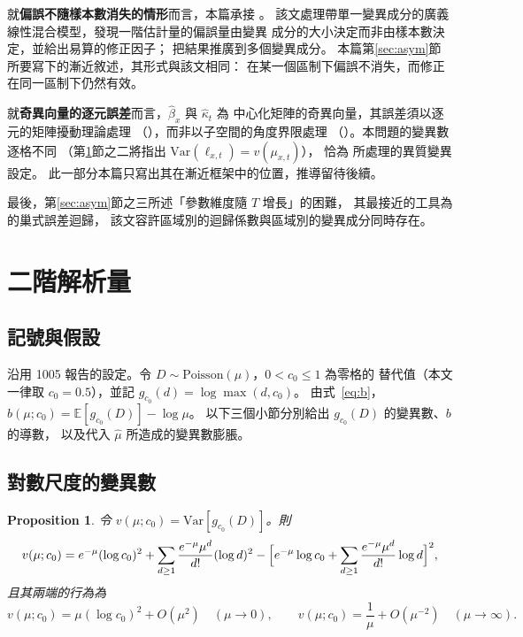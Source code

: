 \documentclass[UTF8, fontset=macnew, a4paper, 12pt]{ctexart}
\newcommand{\Ex}{\mathbb{E}}
\newtheorem{prop}{Proposition}
\begin{document}
就\textbf{偏誤不隨樣本數消失的情形}而言，本篇承接 \citet{breslow1995}。
該文處理帶單一變異成分的廣義線性混合模型，發現一階估計量的偏誤量由變異
成分的大小決定而非由樣本數決定，並給出易算的修正因子；
\citet{linbreslow1996} 把結果推廣到多個變異成分。
本篇第\ref{sec:asym}節所要寫下的漸近敘述，其形式與該文相同：
在某一個區制下偏誤不消失，而修正在同一區制下仍然有效。

就\textbf{奇異向量的逐元誤差}而言，$\hat\beta_x$ 與 $\hat\kappa_t$ 為
中心化矩陣的奇異向量，其誤差須以逐元的矩陣擾動理論處理
（\citealp{abbe2020}），而非以子空間的角度界限處理
（\citealp{caizhang2018}）。本問題的變異數逐格不同
（第\ref{sec:second}節之二將指出 $\mathrm{Var}(\ell_{x,t})=v(\mu_{x,t})$），
恰為 \citet{zhang2022} 所處理的異質變異設定。
此一部分本篇只寫出其在漸近框架中的位置，推導留待後續。

最後，第\ref{sec:asym}節之三所述「參數維度隨 $T$ 增長」的困難，
其最接近的工具為 \citet{lahiri2023} 的巢式誤差迴歸，
該文容許區域別的迴歸係數與區域別的變異成分同時存在。

\section{二階解析量}\label{sec:second}

\subsection{記號與假設}

沿用 1005 報告的設定。令 $D\sim\text{Poisson}(\mu)$，$0<c_0\le1$ 為零格的
替代值（本文一律取 $c_0=0.5$），並記 $g_{c_0}(d)=\log\max(d,c_0)$。
由式~\eqref{eq:b}，$b(\mu;c_0)=\Ex[g_{c_0}(D)]-\log\mu$。
以下三個小節分別給出 $g_{c_0}(D)$ 的變異數、$b$ 的導數，
以及代入 $\hat\mu$ 所造成的變異數膨脹。

\subsection{對數尺度的變異數}

\begin{prop}\label{prop:v}
令 $v(\mu;c_0)=\mathrm{Var}[g_{c_0}(D)]$。則
\begin{equation}\label{eq:v}
v(\mu;c_0)=e^{-\mu}(\log c_0)^2+\sum_{d\ge1}\frac{e^{-\mu}\mu^{d}}{d!}(\log d)^2
-\Bigl[e^{-\mu}\log c_0+\sum_{d\ge1}\frac{e^{-\mu}\mu^{d}}{d!}\log d\Bigr]^{2},
\end{equation}
且其兩端的行為為
\[
v(\mu;c_0)=\mu(\log c_0)^2+O(\mu^2)\quad(\mu\to0),\qquad
v(\mu;c_0)=\frac{1}{\mu}+O(\mu^{-2})\quad(\mu\to\infty).
\]
\end{prop}
\end{document}
